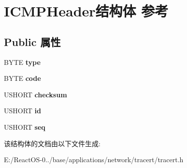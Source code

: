 \hypertarget{struct_i_c_m_p_header}{}\section{I\+C\+M\+P\+Header结构体 参考}
\label{struct_i_c_m_p_header}
\subsection*{Public 属性}
\begin{DoxyCompactItemize}
\item 
\mbox{\label{struct_i_c_m_p_header_a118df9b5a90ba6fe568e07e112cc2ac8}} 
B\+Y\+TE {\bfseries type}
\item 
\mbox{\label{struct_i_c_m_p_header_a96b251c5b4348158a90bcfc53fd7ce2d}} 
B\+Y\+TE {\bfseries code}
\item 
\mbox{\label{struct_i_c_m_p_header_a936b699202e5259ac801ef85fc29cc35}} 
U\+S\+H\+O\+RT {\bfseries checksum}
\item 
\mbox{\label{struct_i_c_m_p_header_a4d8a0128c14bd061ec9a016f171aa1da}} 
U\+S\+H\+O\+RT {\bfseries id}
\item 
\mbox{\label{struct_i_c_m_p_header_a96662821d3509b63b8ac59be566bdf8c}} 
U\+S\+H\+O\+RT {\bfseries seq}
\end{DoxyCompactItemize}


该结构体的文档由以下文件生成\+:\begin{DoxyCompactItemize}
\item 
E\+:/\+React\+O\+S-\/0../base/applications/network/tracert/tracert.\+h\end{DoxyCompactItemize}
